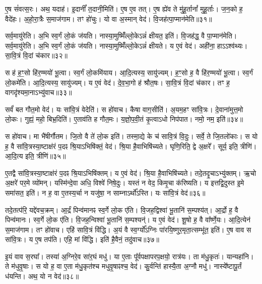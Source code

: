    ए॒ष सं॑वत्स॒रः।
   अथ॒ यदाह॑।
   इ॒दानीं᳚ त॒दानी॒मिति॑।
   ए॒ष ए॒व तत्।
   ए॒ष ह्ये॑व ते मु॑हू॒र्तानां᳚ मुहू॒र्ताः।
    ज॒न॒को ह॒ वैदे॑हः।
   अ॒हो॒रा॒त्रैः स॒माज॑गाम।
   तꣳ हो॑चुः।
   यो वा अ॒स्मान् वेद॑।
   वि॒जह॑त्पा॒प्मान॑मेति॥३१॥

   सर्व॒मायु॑रेति।
   अ॒भि स्व॒र्गं लो॒कं ज॑यति।
   नास्या॒मुष्मिँ॑ल्लो॒के\-ऽन्नं॑ क्षीयत॒ इति॑।
   वि॒जह॑द्ध॒ वै पा॒प्मान॑मेति।
   सर्व॒मायु॑रेति।
   अ॒भि स्व॒र्गं लो॒कं ज॑यति।
   नास्या॒मुष्मिँ॑ल्लो॒केऽन्नं॑ क्षीयते।
   य ए॒वं वेद॑।
   अही॑ना॒ हाऽऽश्व॑थ्यः।
   सा॒वि॒त्रं वि॒दां च॑कार॥३२॥

   स ह॑ ह॒ꣳ॒सो हि॑र॒ण्मयो॑ भू॒त्वा।
   स्व॒र्गं लो॒कमि॑याय।
   आ॒दि॒त्यस्य॒ सायु॑ज्यम्।
   ह॒ꣳ॒सो ह॒ वै हि॑र॒ण्मयो॑ भू॒त्वा।
   स्व॒र्गं लो॒कमे॑ति।
   आ॒दि॒त्यस्य॒ सायु॑ज्यम्।
   य ए॒वं वेद॑।
   दे॒व॒भा॒गो ह॑ श्रौत॒षः।
   सा॒वि॒त्रं वि॒दां च॑कार।
   तꣳ ह॒ वागदृ॑श्यमा॒नाऽभ्यु॑वाच॥३३॥

   सर्वं॑ बत गौत॒मो वेद॑।
   यः सा॑वि॒त्रं वेदेति॑।
   स हो॑वाच।
   कैषा वाग॒सीति॑।
   अ॒यम॒हꣳ सा॑वि॒त्रः।
   दे॒वाना॑मुत्त॒मो लो॒कः।
   गुह्यं॒ महो॒ बिभ्र॒दिति॑।
   ए॒ताव॑ति ह गौत॒मः।
   य॒ज्ञो॒प॒वी॒तं कृ॒त्वाऽधो निप॑पात।
   नमो॒ नम॒ इति॑॥३४॥

   स हो॑वाच।
   मा भै॑षीर्गौतम।
   जि॒तो वै ते॑ लो॒क इति॑।
   तस्मा॒द्ये के च॑ सावि॒त्रं वि॒दुः।
   सर्वे॒ ते जि॒तलो॑काः।
   स यो ह॒ वै सा॑वि॒त्रस्या॒ष्टाक्ष॑रं प॒दꣴ श्रि॒याऽभिषि॑क्तं॒ वेद॑।
   श्रि॒या है॒वाभिषि॑च्यते।
   घृणि॒रिति॒ द्वे अ॒क्षरे᳚।
   सूर्य॒ इति॒ त्रीणि॑।
   आ॒दि॒त्य इति॒ त्रीणि॑॥३५॥

   ए॒तद्वै सा॑वि॒त्रस्या॒ष्टाक्ष॑रं प॒दꣴ श्रि॒याऽभिषि॑क्तम्।
   य ए॒वं वेद॑।
   श्रि॒या है॒वाभिषि॑च्यते।
   तदे॒तदृ॒चाऽभ्यु॑क्तम्।
   ऋ॒चो अ॒क्षरे॑ पर॒मे व्यो॑मन्।
   यस्मि॑न्दे॒वा अधि॒ विश्वे॑ निषे॒दुः।
   यस्तं न वेद॒ किमृ॒चा क॑रिष्यति।
   य इत्तद्वि॒दुस्त इ॒मे समा॑सत॒ इति॑।
   न ह॒ वा ए॒तस्य॒र्चा न यजु॑षा॒ न साम्नाऽर्थो᳚ऽस्ति।
   यः सा॑वि॒त्रं वेद॑॥३६॥

   तदे॒तत्प॑रि॒ यद्दे॑वच॒क्रम्।
   आ॒र्द्रं पिन्व॑मानꣴ स्व॒र्गे लो॒क ए॑ति।
   वि॒जह॒द्विश्वा॑ भू॒तानि॑ स॒म्पश्य॑त्।
   आ॒र्द्रो ह॒ वै पिन्व॑मानः।
   स्व॒र्गे लो॒क ए॑ति।
   वि॒जह॒न्विश्वा॑ भू॒तानि॑ स॒म्पश्यन्॑।
   य ए॒वं वेद॑।
   शू॒षो ह॒ वै वा᳚र्ष्णे॒यः।
   आ॒दि॒त्येन॑ स॒माज॑गाम।
   तꣳ हो॑वाच।
   एहि॑ सावि॒त्रं वि॑द्धि।
   अ॒यं वै स्व॒र्ग्यो᳚ऽग्निः पा॑रयि॒ष्णुर॒मृता॒त्सम्भू॑त॒ इति॑।
   ए॒ष वाव स सा॑वि॒त्रः।
   य ए॒ष तप॑ति।
   एहि॒ मां वि॑द्धि।
   इति॑ है॒वैनं॒ तदु॑वाच॥३७॥
   \anuvakamend

   इ॒यं वाव स॒रघा᳚।
   तस्या॑ अ॒ग्निरे॒व सा॑र॒घं मधु॑।
   या ए॒ताः पू᳚र्वपक्षापरप॒क्षयो॒ रात्र॑यः।
   ता म॑धु॒कृतः॑।
   यान्यहा॑नि।
   ते म॑धुवृ॒षाः।
   स यो ह॒ वा ए॒ता म॑धु॒कृत॑श्च मधुवृ॒षाꣴश्च॒ वेद॑।
   कु॒र्वन्ति॑ हास्यै॒ता अ॒ग्नौ मधु॑।
   नास्ये᳚ष्टापू॒र्तं ध॑यन्ति।
   अथ॒ यो न वेद॑॥३८॥

